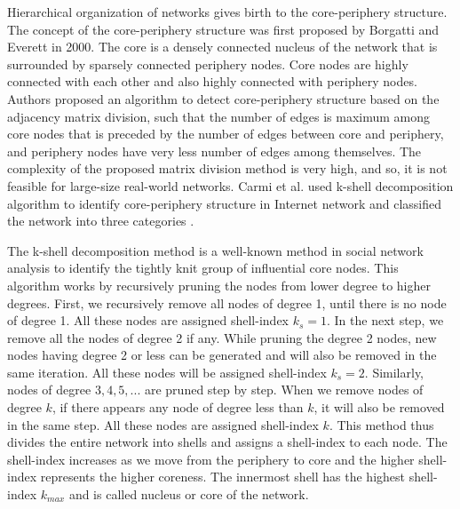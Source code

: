\documentclass[conference]{IEEEtran}
\begin{document}
Hierarchical organization of networks gives birth to the core-periphery structure. The concept of the core-periphery structure was first proposed by Borgatti and Everett \cite{borgatti2000models} in 2000. The core is a densely connected nucleus of the network that is surrounded by sparsely connected periphery nodes. Core nodes are highly connected with each other and also highly connected with periphery nodes. Authors proposed an algorithm to detect core-periphery structure based on the adjacency matrix division, such that the number of edges is maximum among core nodes that is preceded by the number of edges between core and periphery, and periphery nodes have very less number of edges among themselves. The complexity of the proposed matrix division method is very high, and so, it is not feasible for large-size real-world networks. Carmi et al. used k-shell decomposition algorithm to identify core-periphery structure in Internet network and classified the network into three categories \cite{carmi2007model}. %



The k-shell decomposition method \cite{seidman1983network} is a well-known method in social network analysis to identify the tightly knit group of influential core nodes. This algorithm works by recursively pruning the nodes from lower degree to higher degrees. First, we recursively remove all nodes of degree 1, until there is no node of degree 1. All these nodes are assigned shell-index $k_s=1$. In the next step, we remove all the nodes of degree 2 if any. While pruning the degree 2 nodes, new nodes having degree 2 or less can be generated and will also be removed in the same iteration. All these nodes will be assigned shell-index $k_s=2$. Similarly, nodes of degree $3, 4, 5,...$ are pruned step by step. When we remove nodes of degree $k$, if there appears any node of degree less than $k$, it will also be removed in the same step. All these nodes are assigned shell-index $k$. This method thus divides the entire network into shells and assigns a shell-index to each node. The shell-index increases as we move from the periphery to core and the higher shell-index represents the higher coreness. The innermost shell has the highest shell-index $k_{max}$ and is called nucleus or core of the network. 


\end{document}
